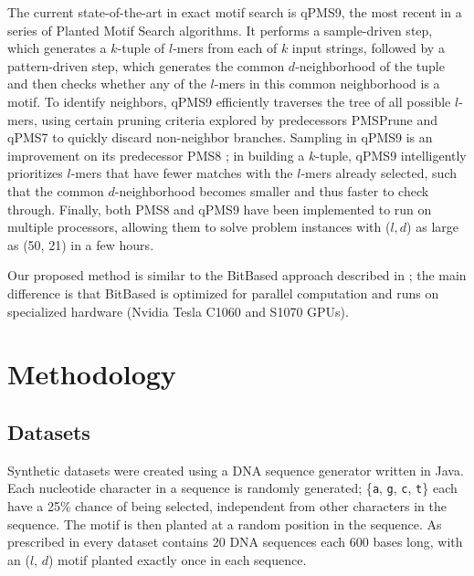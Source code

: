 \documentclass[conference]{IEEEtran}
\begin{document}
	The current state-of-the-art in exact motif search is qPMS9, the most recent in a series \cite{pms2007,pms2014,pms2015} of Planted Motif Search algorithms. It performs a sample-driven step, which generates a $k$-tuple of $l$-mers from each of $k$ input strings, followed by a pattern-driven step, which generates the common $d$-neighborhood of the tuple and then checks whether any of the $l$-mers in this common neighborhood is a motif. To identify neighbors, qPMS9 efficiently traverses the tree of all possible $l$-mers, using certain pruning criteria explored by predecessors PMSPrune and qPMS7 \cite{pms2007} to quickly discard non-neighbor branches. Sampling in qPMS9 is an improvement on its predecessor PMS8 \cite{pms2014}; in building a $k$-tuple, qPMS9 intelligently prioritizes $l$-mers that have fewer matches with the $l$-mers already selected, such that the common $d$-neighborhood becomes smaller and thus faster to check through.  Finally, both PMS8 and qPMS9 have been implemented to run on multiple processors, allowing them to solve problem instances with ($l, d$) as large as (50, 21) in a few hours.

	Our proposed method %
	is similar to the BitBased approach described in \cite{dasari2010efficient}; the main difference is that BitBased is optimized for parallel computation and runs on specialized hardware (Nvidia Tesla C1060 and S1070 GPUs).
	\newpage

\section{Methodology}

	\subsection{Datasets}
		Synthetic datasets were created using a DNA sequence generator written in Java. Each nucleotide character in a sequence is randomly generated; \{\texttt{a}, \texttt{g}, \texttt{c}, \texttt{t}\} each have a 25\% chance of being selected, independent from other characters in the sequence. The motif is then planted at a random position in the sequence. As prescribed in \cite{pevzner2000combinatorial} every dataset contains 20 DNA sequences each 600 bases long, with an ($l$, $d$) motif planted exactly once in each sequence.
\end{document}
